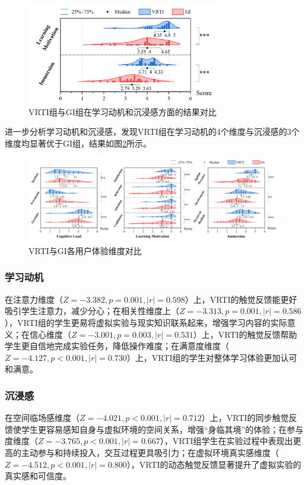 \documentclass[runningheads]{llncs}
\begin{document}
\begin{figure}[t]
  \centering
  \includegraphics[width=0.75\textwidth]{image/user-experience-result.pdf}
  \caption{VRTI组与GI组在学习动机和沉浸感方面的结果对比}
  \label{fig:user-experience-result}
\end{figure}

进一步分析学习动机和沉浸感，发现VRTI组在学习动机的4个维度与沉浸感的3个维度均显著优于GI组，结果如图\ref{fig:three-user-experience-result}所示。

\begin{figure}[t]
  \centering
  \includegraphics[width=\textwidth]{image/three-user-experience-result.pdf}
  \caption{VRTI与GI各用户体验维度对比}
  \label{fig:three-user-experience-result}
\end{figure}

\subsubsection{学习动机}
在注意力维度（$Z=-3.382,p=0.001,|r|=0.598$）上，VRTI的触觉反馈能更好吸引学生注意力，减少分心；在相关性维度上（$Z=-3.313,p=0.001,|r|=0.586$），VRTI组的学生更易将虚拟实验与现实知识联系起来，增强学习内容的实际意义；在信心维度（$Z=-3.001,p=0.003,|r|=0.531$）上，VRTI的触觉反馈帮助学生更自信地完成实验任务，降低操作难度；在满意度维度（$Z=-4.127,p<0.001,|r|=0.730$）上，VRTI组的学生对整体学习体验更加认可和满意。

\subsubsection{沉浸感}
在空间临场感维度（$Z=-4.021,p<0.001,|r|=0.712$）上，VRTI的同步触觉反馈使学生更容易感知自身与虚拟环境的空间关系，增强“身临其境”的体验；在参与度维度（$Z=-3.765,p<0.001,|r|=0.667$），VRTI组学生在实验过程中表现出更高的主动参与和持续投入，交互过程更具吸引力；在虚拟环境真实感维度（$Z=-4.512,p<0.001,|r|=0.800$），VRTI的动态触觉反馈显著提升了虚拟实验的真实感和可信度。
\end{document}
